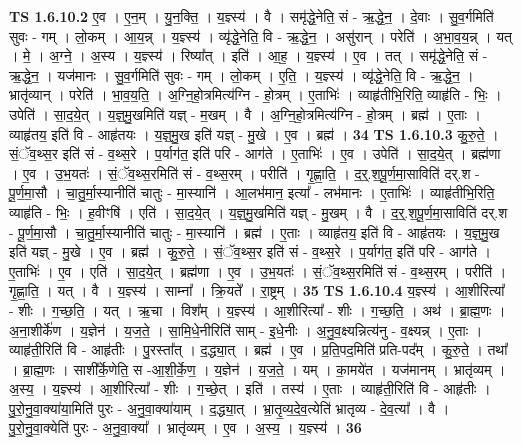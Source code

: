 \documentclass[17pt]{extarticle}
\begin{document}
                  \newline
                                \textbf{ TS 1.6.10.2} \newline
                  ए॒व । ए॒न॒म् । यु॒न॒क्ति॒ । य॒ज्ञ्स्य॑ । वै । समृ॑द्धे॒नेति॒ सं - ऋ॒द्धे॒न॒ । दे॒वाः । सु॒व॒र्गमिति॑ सुवः - गम् । लो॒कम् । आ॒य॒न्न् । य॒ज्ञ्स्य॑ । व्यृ॑द्धे॒नेति॒ वि - ऋ॒द्धे॒न॒ । असु॑रान् । परेति॑ । अ॒भा॒व॒य॒न्न् । यत् । मे॒ । अ॒ग्ने॒ । अ॒स्य । य॒ज्ञ्स्य॑ । रिष्या᳚त् । इति॑ । आ॒ह॒ । य॒ज्ञ्स्य॑ । ए॒व । तत् । समृ॑द्धे॒नेति॒ सं - ऋ॒द्धे॒न॒ । यज॑मानः । सु॒व॒र्गमिति॑ सुवः - गम् । लो॒कम् । ए॒ति॒ । य॒ज्ञ्स्य॑ । व्यृ॑द्धे॒नेति॒ वि - ऋ॒द्धे॒न॒ । भ्रातृ॑व्यान् । परेति॑ । भा॒व॒य॒ति॒ । अ॒ग्नि॒हो॒त्रमित्य॑ग्नि - हो॒त्रम् । ए॒ताभिः॑ । व्याहृ॑तीभि॒रिति॒ व्याहृ॑ति - भिः॒ । उपेति॑ । सा॒द॒ये॒त् । य॒ज्ञ्॒मु॒खमिति॑ यज्ञ् - म॒खम् । वै । अ॒ग्नि॒हो॒त्रमित्य॑ग्नि - हो॒त्रम् । ब्रह्म॑ । ए॒ताः । व्याहृ॑तय॒ इति॑ वि - आहृ॑तयः । य॒ज्ञ्॒मु॒ख इति॑ यज्ञ् - मु॒खे । ए॒व । ब्रह्म॑ । \textbf{  34} \newline
                  \newline
                                \textbf{ TS 1.6.10.3} \newline
                  कु॒रु॒ते॒ । सं॒ॅव॒थ्स॒र इति॑ सं - व॒थ्स॒रे । प॒र्याग॑त॒ इति॑ परि - आग॑ते । ए॒ताभिः॑ । ए॒व । उपेति॑ । सा॒द॒ये॒त् । ब्रह्म॑णा । ए॒व । उ॒भ॒यतः॑ । सं॒ॅव॒थ्स॒रमिति॑ सं - व॒थ्स॒रम् । परीति॑ । गृ॒ह्णा॒ति॒ । द॒र्॒.श॒पू॒र्ण॒मा॒साविति॑ दर्.श - पू॒र्ण॒मा॒सौ । चा॒तु॒र्मा॒स्यानीति॑ चातुः - मा॒स्यानि॑ । आ॒लभ॑मान॒ इत्या᳚ - लभ॑मानः । ए॒ताभिः॑ । व्याहृ॑तीभि॒रिति॒ व्याहृ॑ति - भिः॒ । ह॒वीꣳषि॑ । एति॑ । सा॒द॒ये॒त् । य॒ज्ञ्॒मु॒खमिति॑ यज्ञ् - मु॒खम् । वै । द॒र्॒.श॒पू॒र्ण॒मा॒साविति॑ दर्.श - पू॒र्ण॒मा॒सौ । चा॒तु॒र्मा॒स्यानीति॑ चातुः - मा॒स्यानि॑ । ब्रह्म॑ । ए॒ताः । व्याहृ॑तय॒ इति॑ वि - आहृ॑तयः । य॒ज्ञ्॒मु॒ख इति॑ यज्ञ् - मु॒खे । ए॒व । ब्रह्म॑ । कु॒रु॒ते॒ । सं॒ॅव॒थ्स॒र इति॑ सं - व॒थ्स॒रे । प॒र्याग॑त॒ इति॑ परि - आग॑ते । ए॒ताभिः॑ । ए॒व । एति॑ । सा॒द॒ये॒त् । ब्रह्म॑णा । ए॒व । उ॒भ॒यतः॑ । सं॒ॅव॒थ्स॒रमिति॑ सं - व॒थ्स॒रम् । परीति॑ । गृ॒ह्णा॒ति॒ । यत् । वै । य॒ज्ञ्स्य॑ । साम्ना᳚ । क्रि॒यते᳚ । रा॒ष्ट्रम् । \textbf{  35} \newline
                  \newline
                                \textbf{ TS 1.6.10.4} \newline
                  य॒ज्ञ्स्य॑ । आ॒शीरित्या᳚ - शीः । ग॒च्छ॒ति॒ । यत् । ऋ॒चा । विश᳚म् । य॒ज्ञ्स्य॑ । आ॒शीरित्या᳚ - शीः । ग॒च्छ॒ति॒ । अथ॑ । ब्रा॒ह्म॒णः । अ॒ना॒शीर्के॑ण । य॒ज्ञेन॑ । य॒ज॒ते॒ । सा॒मि॒धे॒नीरिति॑ साम् - इ॒धे॒नीः । अ॒नु॒व॒क्ष्यन्नित्य॑नु - व॒क्ष्यन्न् । ए॒ताः । व्याहृ॑ती॒रिति॑ वि - आहृ॑तीः । पु॒रस्ता᳚त् । द॒द्ध्या॒त् । ब्रह्म॑ । ए॒व । प्र॒ति॒पद॒मिति॑ प्रति-पद᳚म् । कु॒रु॒ते॒ । तथा᳚ । ब्रा॒ह्म॒णः । साशी᳚र्के॒णेति॒ स -आ॒शी॒र्के॒ण॒ । य॒ज्ञेन॑ । य॒ज॒ते॒ । यम् । का॒मये॑त । यज॑मानम् । भ्रातृ॑व्यम् । अ॒स्य॒ । य॒ज्ञ्स्य॑ । आ॒शीरित्या᳚ - शीः । ग॒च्छे॒त् । इति॑ । तस्य॑ । ए॒ताः । व्याहृ॑ती॒रिति॑ वि - आहृ॑तीः । पु॒रो॒नु॒वा॒क्या॑या॒मिति॑ पुरः - अ॒नु॒वा॒क्या॑याम् । द॒द्ध्या॒त् । भ्रा॒तृ॒व्य॒दे॒व॒त्येति॑ भ्रातृव्य - दे॒व॒त्या᳚ । वै । पु॒रो॒नु॒वा॒क्येति॑ पुरः - अ॒नु॒वा॒क्या᳚ । भ्रातृ॑व्यम् । ए॒व । अ॒स्य॒ । य॒ज्ञ्स्य॑ । \textbf{  36} \newline
\end{document}
